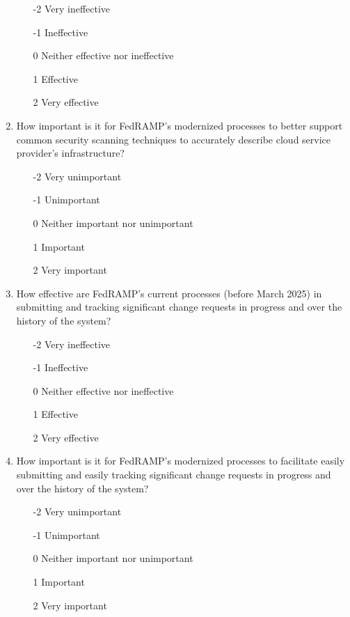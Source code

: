 \documentclass{jdf}
\begin{document}
\begin{enumerate}
    \begin{enumerate}
        \item [-2] Very ineffective
        \item [-1] Ineffective
        \item  [0] Neither effective nor ineffective
        \item  [1] Effective 
        \item  [2] Very effective
    \end{enumerate}
    \item How important is it for FedRAMP's modernized processes to better support common security scanning techniques to accurately describe cloud service provider's infrastructure?
    \begin{enumerate}
        \item [-2] Very unimportant
        \item [-1] Unimportant
        \item  [0] Neither important nor unimportant
        \item  [1] Important
        \item  [2] Very important
    \end{enumerate}
    \item How effective are FedRAMP's current processes (before March 2025) in submitting and tracking significant change requests in progress and over the history of the system?
    \begin{enumerate}
        \item [-2] Very ineffective
        \item [-1] Ineffective
        \item  [0] Neither effective nor ineffective
        \item  [1] Effective 
        \item  [2] Very effective
    \end{enumerate}
    \item How important is it for FedRAMP's modernized processes to facilitate easily submitting and easily tracking significant change requests in progress and over the history of the system?
    \begin{enumerate}
        \item [-2] Very unimportant
        \item [-1] Unimportant
        \item  [0] Neither important nor unimportant
        \item  [1] Important
        \item  [2] Very important

\end{enumerate}
\end{enumerate}
\end{document}
